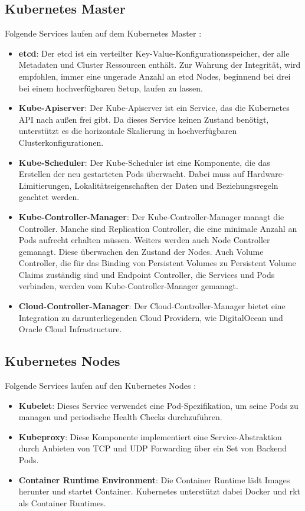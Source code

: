 \subsection{Kubernetes Master}
Folgende Services laufen auf dem Kubernetes Master \cite{LearnOpenShift}:
\begin{itemize}
	\item \textbf{etcd}: Der etcd ist ein verteilter Key-Value-Konfigurationsspeicher, der alle Metadaten und Cluster Ressourcen enthält. Zur Wahrung der Integrität, wird empfohlen, immer eine ungerade Anzahl an etcd Nodes, beginnend bei drei bei einem hochverfügbaren Setup, laufen zu lassen.
	\item \textbf{Kube-Apiserver}: Der Kube-Apiserver ist ein Service, das die Kubernetes API nach außen frei gibt. Da dieses Service keinen Zustand benötigt, unterstützt es die horizontale Skalierung in hochverfügbaren Clusterkonfigurationen.
	\item \textbf{Kube-Scheduler}: Der Kube-Scheduler ist eine Komponente, die das Erstellen der neu gestarteten Pods überwacht. Dabei muss auf Hardware-Limitierungen, Lokalitätseigenschaften der Daten und Beziehungsregeln geachtet werden.
	\item \textbf{Kube-Controller-Manager}: Der Kube-Controller-Manager managt die Controller. Manche sind Replication Controller, die eine minimale Anzahl an Pods aufrecht erhalten müssen. Weiters werden auch Node Controller gemanagt. Diese überwachen den Zustand der Nodes. Auch Volume Controller, die für das Binding von Persistent Volumes zu Persistent Volume Claims zuständig sind und Endpoint Controller, die Services und Pods verbinden, werden vom Kube-Controller-Manager gemanagt.
	\item \textbf{Cloud-Controller-Manager}: Der Cloud-Controller-Manager bietet eine Integration zu darunterliegenden Cloud Providern, wie DigitalOcean und Oracle Cloud Infrastructure.
\end{itemize}

\subsection{Kubernetes Nodes}
Folgende Services laufen auf den Kubernetes Nodes \cite{LearnOpenShift}:
\begin{itemize}
	\item \textbf{Kubelet}: Dieses Service verwendet eine Pod-Spezifikation, um seine Pods zu managen und periodische Health Checks durchzuführen.
	\item \textbf{Kubeproxy}: Diese Komponente implementiert eine Service-Abstraktion durch Anbieten von TCP und UDP Forwarding über ein Set von Backend Pods.
	\item \textbf{Container Runtime Environment}: Die Container Runtime lädt Images herunter und startet Container. Kubernetes unterstützt dabei Docker und rkt als Container Runtimes.
\end{itemize}

